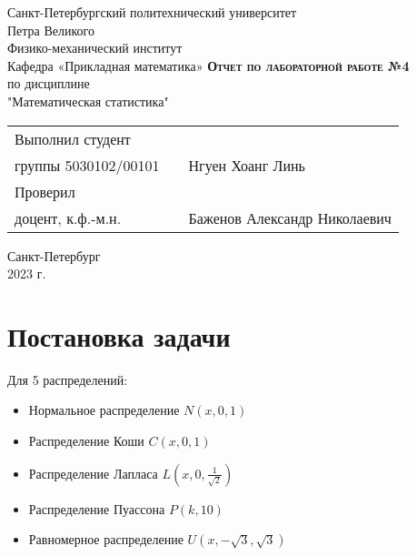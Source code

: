 \documentclass[12pt,a4paper]{article}
\begin{document}
    \begin{titlepage}
        \begin{center}
            \large
            Санкт-Петербургский политехнический университет\\Петра Великого\\
            \vspace{0.5cm}
            Физико-механический институт\\
            \vspace{0.25cm}
            Кафедра «Прикладная математика»
            \vfill
            \textsc{\LARGE\textbf{Отчет по лабораторной работе №4}}\\[5mm]
            \Large
            по дисциплине\\"Математическая статистика"
        \end{center}
        \vfill
        \begin{tabular}{l p{175pt} l}
            Выполнил студент \\ группы 5030102/00101 && Нгуен Хоанг Линь
            \vspace{0.25cm}
            \\Проверил \\ доцент, к.ф.-м.н. && Баженов Александр Николаевич
        \end{tabular}
        \vfill
        \begin{center}
            Санкт-Петербург \\ 2023 г.
        \end{center}
    \end{titlepage}
    
\newpage
\begin{center}
    \tableofcontents
    \setcounter{page}{2}
\end{center}
\newpage
\begin{center}
    \listoffigures
\end{center}

\newpage
\section{Постановка задачи}
Для 5 распределений:
\begin{itemize}
    \item Нормальное распределение $N(x,0,1)$
    \item Распределение Коши $C(x,0,1)$
    \item Распределение Лапласа $L(x,0,\frac{1}{\sqrt{2}})$
    \item Распределение Пуассона $P(k,10)$
    \item Равномерное распределение $U(x,-\sqrt{3},\sqrt{3})$
\end{itemize}
\end{document}
